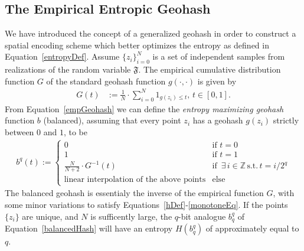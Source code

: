 \documentclass[nips13submit_09,times,art10]{article} %
\begin{document}
\subsection{The Empirical Entropic Geohash}

We have introduced the concept of a generalized geohash in order to construct a spatial encoding
scheme which better optimizes the entropy as defined in Equation~\ref{entropyDef}.
Assume $\{z_i\}_{i=0}^N$ is a set of independent samples from realizations of the random variable
$\mathfrak{F}$. The empirical cumulative distribution function $G$ of the standard geohash function
$g(\cdot, \cdot)$ is given by
\begin{align}
G(t) &:= \frac{1}{N} \cdot \sum_{i=0}^{N} 1_{g(z_i) \leq t}, \, t \in [0,1]. \label{empGeohash}
\end{align}
From Equation~\ref{empGeohash} we can define the {\it entropy maximizing geohash} function
$b$ (balanced), assuming that every point $z_i$ has a geohash $g(z_i)$ strictly between $0$ and
$1$, to be
\begin{align}
b^q(t) :=
  \begin{cases}
    0 &\mbox{if } t = 0\\
    1 &\mbox{if } t = 1\\
    \frac{N}{N+2} \cdot G^{-1}(t) &\mbox{if } \, \exists \, i \in \mathbb{Z} \, \text{s.t.} \, t = i / 2^{q} \\
    \text{linear interpolation of the above points} & \text{else}
  \end{cases} \label{balancedHash}
\end{align}
The balanced geohash is essentialy the inverse of the empirical function $G$, with some minor
variations to satisfy Equations~\ref{hDef}-\ref{monotoneEq}.
If the points $\{z_i\}$ are unique, and $N$ is sufficently large, the $q$-bit analogue $b_q^q$
of Equation~\ref{balancedHash} will have an entropy $H(b_q^q)$ of approximately equal to $q$.
\end{document}
